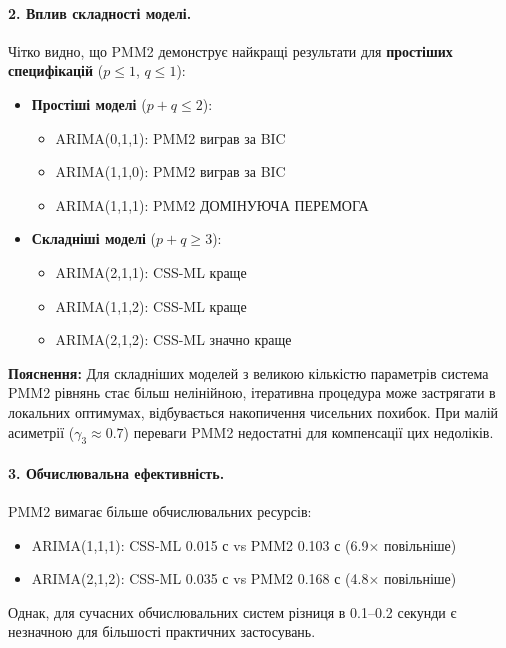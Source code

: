 \paragraph{2. Вплив складності моделі.}
Чітко видно, що PMM2 демонструє найкращі результати для \textbf{простіших специфікацій} ($p \leq 1$, $q \leq 1$):

\begin{itemize}
    \item \textbf{Простіші моделі} ($p+q \leq 2$):
    \begin{itemize}
        \item ARIMA(0,1,1): PMM2 виграв за BIC
        \item ARIMA(1,1,0): PMM2 виграв за BIC
        \item ARIMA(1,1,1): PMM2 ДОМІНУЮЧА ПЕРЕМОГА
    \end{itemize}

    \item \textbf{Складніші моделі} ($p+q \geq 3$):
    \begin{itemize}
        \item ARIMA(2,1,1): CSS-ML краще
        \item ARIMA(1,1,2): CSS-ML краще
        \item ARIMA(2,1,2): CSS-ML значно краще
    \end{itemize}
\end{itemize}

\noindent\textbf{Пояснення:} Для складніших моделей з великою кількістю параметрів система PMM2 рівнянь стає більш нелінійною, ітеративна процедура може застрягати в локальних оптимумах, відбувається накопичення чисельних похибок. При малій асиметрії ($\gamma_3 \approx 0.7$) переваги PMM2 недостатні для компенсації цих недоліків.

\paragraph{3. Обчислювальна ефективність.}
PMM2 вимагає більше обчислювальних ресурсів:
\begin{itemize}
    \item ARIMA(1,1,1): CSS-ML 0.015 с vs PMM2 0.103 с (6.9$\times$ повільніше)
    \item ARIMA(2,1,2): CSS-ML 0.035 с vs PMM2 0.168 с (4.8$\times$ повільніше)
\end{itemize}

Однак, для сучасних обчислювальних систем різниця в 0.1--0.2 секунди є незначною для більшості практичних застосувань.

